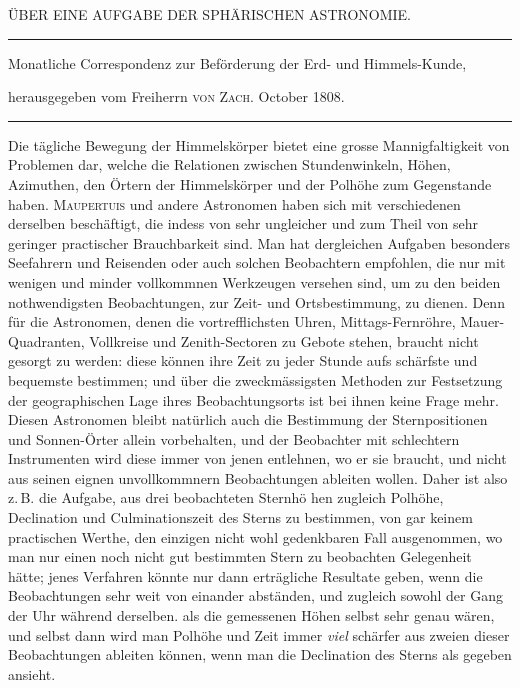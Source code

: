 \clearpage{}%
\begin{center}
{\small ÜBER EINE AUFGABE DER SPHÄRISCHEN ASTRONOMIE.\par}
\medskip\hrule\medskip
{\small Monatliche Correspondenz zur Beförderung der Erd- und Himmels-Kunde,\par
herausgegeben vom Freiherrn \textsc{von Zach}. October 1808.\par}
\medskip\hrule
\end{center}\medskip
Die tägliche Bewegung der Himmelskörper bietet eine grosse Mannigfaltigkeit
von Problemen dar, welche die Relationen zwischen Stundenwinkeln,
Höhen, Azimuthen, den Örtern der Himmelskörper und der Polhöhe zum Gegenstande
haben. \textsc{Maupertuis} und andere Astronomen haben sich mit verschiedenen
derselben beschäftigt, die indess von sehr ungleicher und zum Theil von
sehr geringer practischer Brauchbarkeit sind. Man hat dergleichen Aufgaben
besonders Seefahrern und Reisenden oder auch solchen Beobachtern empfohlen,
die nur mit wenigen und minder vollkommnen Werkzeugen versehen sind, um
zu den beiden nothwendigsten Beobachtungen, zur Zeit- und Ortsbestimmung,
zu dienen. Denn für die Astronomen, denen die vortrefflichsten Uhren, Mittags-Fernröhre,
Mauer-Quadranten, Vollkreise und Zenith-Sectoren zu Gebote stehen,
braucht nicht gesorgt zu werden: diese können ihre Zeit zu jeder Stunde
aufs schärfste und bequemste bestimmen; und über die zweckmässigsten Methoden
zur Festsetzung der geographischen Lage ihres Beobachtungsorts ist bei ihnen
keine Frage mehr. Diesen Astronomen bleibt natürlich auch die Bestimmung
der Sternpositionen und Sonnen-Örter allein vorbehalten, und der Beobachter
mit schlechtern Instrumenten wird diese immer von jenen entlehnen, wo
er sie braucht, und nicht aus seinen eignen unvollkommnern Beobachtungen ableiten
wollen. Daher ist also z.\,B. die Aufgabe, aus drei beobachteten Sternhö%
%
hen zugleich Polhöhe, Declination und Culminationszeit des Sterns zu bestimmen,
von gar keinem practischen Werthe, den einzigen nicht wohl gedenkbaren
Fall ausgenommen, wo man nur einen noch nicht gut bestimmten Stern zu beobachten
Gelegenheit hätte; jenes Verfahren könnte nur dann erträgliche Resultate
geben, wenn die Beobachtungen sehr weit von einander abständen, und zugleich
sowohl der Gang der Uhr während derselben. als die gemessenen Höhen selbst
sehr genau wären, und selbst dann wird man Polhöhe und Zeit immer \textit{viel} schärfer
aus zweien dieser Beobachtungen ableiten können, wenn man die Declination
des Sterns als gegeben ansieht.


